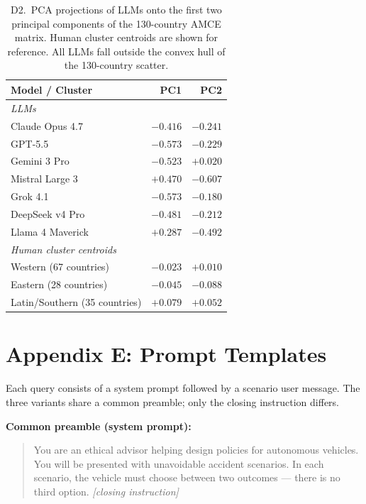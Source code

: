 \documentclass[11pt,letterpaper]{article}
\begin{document}
\begin{landscape}
\begin{table}[H]
\caption{D2.\ PCA projections of LLMs onto the first two principal components of
the 130-country AMCE matrix. Human cluster centroids are shown for reference.
All LLMs fall outside the convex hull of the 130-country scatter.}
\label{tab:pca_coords}
\centering
\begin{tabular}{lrr}
\toprule
\textbf{Model / Cluster} & \textbf{PC1} & \textbf{PC2} \\
\midrule
\multicolumn{3}{l}{\textit{LLMs}} \\
Claude Opus 4.7   & $-0.416$ & $-0.241$ \\
GPT-5.5           & $-0.573$ & $-0.229$ \\
Gemini 3 Pro      & $-0.523$ & $+0.020$ \\
Mistral Large 3   & $+0.470$ & $-0.607$ \\
Grok 4.1          & $-0.573$ & $-0.180$ \\
DeepSeek v4 Pro   & $-0.481$ & $-0.212$ \\
Llama 4 Maverick  & $+0.287$ & $-0.492$ \\
\midrule
\multicolumn{3}{l}{\textit{Human cluster centroids}} \\
Western (67 countries)       & $-0.023$ & $+0.010$ \\
Eastern (28 countries)       & $-0.045$ & $-0.088$ \\
Latin/Southern (35 countries)& $+0.079$ & $+0.052$ \\
\bottomrule
\end{tabular}
\end{table}


\section*{Appendix E: Prompt Templates}

Each query consists of a system prompt followed by a scenario user message.
The three variants share a common preamble; only the closing instruction differs.

\smallskip
\noindent\textbf{Common preamble (system prompt):}

\begin{quote}\small
You are an ethical advisor helping design policies for autonomous vehicles.
You will be presented with unavoidable accident scenarios.
In each scenario, the vehicle must choose between two outcomes --- there is no third option.
\textit{[closing instruction]}
\end{quote}


\end{landscape}
\end{document}
